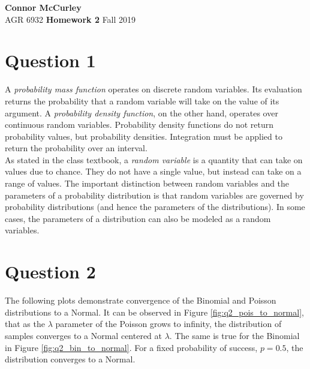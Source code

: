 \documentclass{article}[12 pt]
\begin{document}
	
\begin{center}
	\textbf{\Large Connor McCurley} \\
	AGR 6932  \qquad \quad \quad \textbf{\large Homework 2} \quad \quad \qquad Fall 2019 
\end{center}



\section*{Question 1}
A \textit{probability mass function} operates on discrete random variables.  Its evaluation returns the probability that a random variable will take on the value of its argument.  A \textit{probability  density function}, on the other hand, operates over continuous random variables.  Probability density functions do not return probability values, but probability densities. Integration must be applied to return the probability over an interval. \\

\noindent
As stated in the class textbook, a \textit{random variable} is a quantity that can take on values due to chance.  They do not have a single value, but instead can take on a range of values.  The important distinction between random variables and the parameters of a probability distribution is that random variables are governed by probability distributions (and hence the parameters of the distributions).  In some cases, the parameters of a distribution can also be modeled as a random variables. 


\section*{Question 2}
The following plots demonstrate convergence of the Binomial and Poisson distributions to a Normal.  It can be observed in Figure \ref{fig:q2_pois_to_normal}, that as the $\lambda$ parameter of the Poisson grows to infinity, the distribution of samples converges to a Normal centered at $\lambda$.  The same is true for the Binomial in Figure \ref{fig:q2_bin_to_normal}.  For a fixed probability of success, $p=0.5$, the distribution converges to a Normal. 
\end{document}
